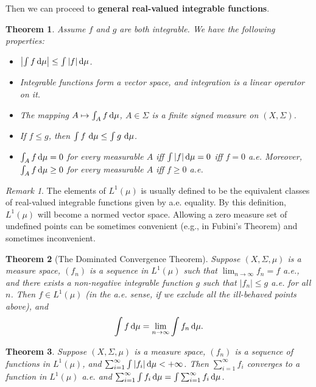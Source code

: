 \documentclass[openany]{book}
\newtheorem{theorem}{Theorem}[chapter]
\theoremstyle{definition}
\theoremstyle{remark}
\newtheorem*{remark}{Remark}
\begin{document}
Then we can proceed to \textbf{general real-valued integrable functions}.
\begin{theorem}
    Assume $f$ and $g$ are both integrable. We have the following properties:
    \begin{itemize}
        \item $\left|\int f\dif\mu\right|\le\int|f|\dif\mu$.
        \item Integrable functions form a vector space, and integration is a linear operator on it.
        \item The mapping $A\mapsto\int_Af \dif\mu$, $A\in\Sigma$ is a finite signed measure on $(X,\Sigma)$.
        \item If $f\le g$, then $\int f\,\dif\mu\le\int g\,\dif\mu$.
        \item $\int_A f \dif\mu=0$ for every measurable $A$ iff $\int|f|\dif\mu=0$ iff $f=0$ a.e. Moreover, $\int_A f \dif\mu\ge0$ for every measurable $A$ iff $f\ge0$ a.e.
    \end{itemize}
\end{theorem}
\begin{remark}
    The elements of $L^1(\mu)$ is usually defined to be the equivalent classes of real-valued integrable functions given by a.e. equality. By this definition, $L^1(\mu)$ will become a normed vector space. Allowing a zero measure set of undefined points can be sometimes convenient (e.g., in Fubini's Theorem) and sometimes inconvenient.
\end{remark}
\begin{theorem}[The Dominated Convergence Theorem]
    Suppose $(X,\Sigma,\mu)$ is a measure space, $(f_n)$ is a sequence in $L^1(\mu)$ such that $\lim_{n\to\infty}f_n=f$ a.e., and there exists a non-negative integrable function $g$ such that $|f_n|\le g$ a.e. for all $n$. Then $f\in L^1(\mu)$ (in the a.e. sense, if we exclude all the ill-behaved points above), and
    \begin{equation*}
        \int f \dif\mu=\lim_{n\to\infty}\int f_n \dif\mu.
    \end{equation*}
\end{theorem}
\begin{theorem}\label{thm:L1Banach}
    Suppose $(X,\Sigma,\mu)$ is a measure space, $(f_n)$ is a sequence of functions in $L^1(\mu)$, and $\sum_{i=1}^{\infty}\int|f_i|\dif\mu<+\infty$. Then $\sum_{i=1}^{\infty}f_i$ converges to a function in $L^1(\mu)$ a.e. and $\sum_{i=1}^{\infty}\int f_i \dif\mu=\int \sum_{i=1}^{\infty}f_i \dif\mu$.
\end{theorem}
\end{document}
